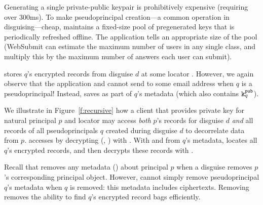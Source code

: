 Generating a single private-public keypair is prohibitively expensive (requiring over 300ms). To
make pseudoprincipal creation---a common operation in disguising---cheap, \sys maintains a
fixed-size pool of pregenerated keys that is periodically refreshed offline. The application tells
\sys an appropriate size of the pool (\eg WebSubmit can estimate the maximum number of users in any
single class, and multiply this by the maximum number of answers each user can submit).

\sys stores $q$'s encrypted records from disguise $d$ at some locator .  However, we again
observe that the application and \sys cannot send  to some email address when $q$ is a
pseudoprincipal! Instead, \sys saves  as part of $q$'s metadata (which also contains $\texttt{\ensuremath{\texttt{k}^{\text{pub}}_{q}}}$).


We illustrate in Figure~\ref{f:recursive} how a client that provides private key  for
natural principal $p$ and locator  may access \emph{both} $p$'s records for disguise $d$
\emph{and} all records of all pseudoprincipals $q$ created during disguise $d$ to decorrelate data
from $p$.  \sys accesses  by decrypting \enc(, ) with . With
 and  from $q$'s metadata, \sys locates all $q$'s encrypted records,
and then decrypts these records with .


Recall that \sys removes any metadata (\eg {}) about principal $p$ when a disguise removes
$p$'s corresponding principal object.
However, \sys cannot simply remove pseudoprincipal $q$'s metadata when $q$ is removed: this metadata
includes  ciphertexts. Removing  removes the ability to find $q$'s encrypted
record bags efficiently.

